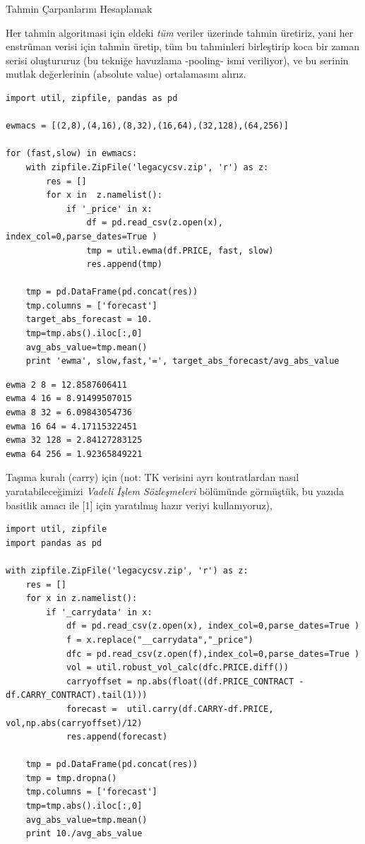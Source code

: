 \documentclass[12pt,fleqn]{article}\usepackage{../../common}
\begin{document}
Tahmin Çarpanlarını Hesaplamak

Her tahmin algoritmasi için eldeki {\em tüm} veriler üzerinde tahmin üretiriz,
yani her enstrüman verisi için tahmin üretip, tüm bu tahminleri birleştirip koca
bir zaman serisi oluştururuz (bu tekniğe havuzlama -pooling- ismi veriliyor), ve
bu serinin mutlak değerlerinin (absolute value) ortalamasını alırız.

\begin{verbatim}
import util, zipfile, pandas as pd

ewmacs = [(2,8),(4,16),(8,32),(16,64),(32,128),(64,256)]

for (fast,slow) in ewmacs: 
    with zipfile.ZipFile('legacycsv.zip', 'r') as z:
        res = []
        for x in  z.namelist():
            if '_price' in x:
                df = pd.read_csv(z.open(x), index_col=0,parse_dates=True )
                tmp = util.ewma(df.PRICE, fast, slow)
                res.append(tmp)

    tmp = pd.DataFrame(pd.concat(res))
    tmp.columns = ['forecast']
    target_abs_forecast = 10.
    tmp=tmp.abs().iloc[:,0]
    avg_abs_value=tmp.mean()    
    print 'ewma', slow,fast,'=', target_abs_forecast/avg_abs_value
\end{verbatim}

\begin{verbatim}
ewma 2 8 = 12.8587606411
ewma 4 16 = 8.91499507015
ewma 8 32 = 6.09843054736
ewma 16 64 = 4.17115322451
ewma 32 128 = 2.84127283125
ewma 64 256 = 1.92365849221
\end{verbatim}

Taşıma kuralı (carry) için (not: TK verisini ayrı kontratlardan nasıl
yaratabileceğimizi {\em Vadeli İşlem Sözleşmeleri} bölümünde görmüştük, bu
yazıda basitlik amacı ile [1] için yaratılmış hazır veriyi kullanıyoruz),

\begin{verbatim}
import util, zipfile
import pandas as pd

with zipfile.ZipFile('legacycsv.zip', 'r') as z:
    res = []
    for x in z.namelist():
        if '_carrydata' in x:
            df = pd.read_csv(z.open(x), index_col=0,parse_dates=True )
            f = x.replace("__carrydata","_price")
            dfc = pd.read_csv(z.open(f),index_col=0,parse_dates=True )     
            vol = util.robust_vol_calc(dfc.PRICE.diff())
            carryoffset = np.abs(float((df.PRICE_CONTRACT - df.CARRY_CONTRACT).tail(1)))
            forecast =  util.carry(df.CARRY-df.PRICE, vol,np.abs(carryoffset)/12)
            res.append(forecast)

    tmp = pd.DataFrame(pd.concat(res))
    tmp = tmp.dropna()
    tmp.columns = ['forecast']
    tmp=tmp.abs().iloc[:,0]
    avg_abs_value=tmp.mean()
    print 10./avg_abs_value 
\end{verbatim}
\end{document}
